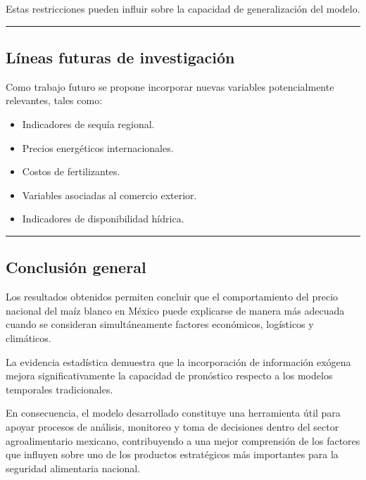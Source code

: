 \documentclass[11pt]{article}
\providecommand{\tightlist}{%
      \setlength{\itemsep}{0pt}\setlength{\parskip}{0pt}}
\begin{document}
Estas restricciones pueden influir sobre la capacidad de generalización
del modelo.

\begin{center}\rule{0.5\linewidth}{0.5pt}\end{center}

\hypertarget{luxedneas-futuras-de-investigaciuxf3n}{%
\subsection{Líneas futuras de
investigación}\label{luxedneas-futuras-de-investigaciuxf3n}}

Como trabajo futuro se propone incorporar nuevas variables
potencialmente relevantes, tales como:

\begin{itemize}
\tightlist
\item
  Indicadores de sequía regional.
\item
  Precios energéticos internacionales.
\item
  Costos de fertilizantes.
\item
  Variables asociadas al comercio exterior.
\item
  Indicadores de disponibilidad hídrica.
\end{itemize}

\begin{center}\rule{0.5\linewidth}{0.5pt}\end{center}

\hypertarget{conclusiuxf3n-general}{%
\subsection{Conclusión general}\label{conclusiuxf3n-general}}

Los resultados obtenidos permiten concluir que el comportamiento del
precio nacional del maíz blanco en México puede explicarse de manera más
adecuada cuando se consideran simultáneamente factores económicos,
logísticos y climáticos.

La evidencia estadística demuestra que la incorporación de información
exógena mejora significativamente la capacidad de pronóstico respecto a
los modelos temporales tradicionales.

En consecuencia, el modelo desarrollado constituye una herramienta útil
para apoyar procesos de análisis, monitoreo y toma de decisiones dentro
del sector agroalimentario mexicano, contribuyendo a una mejor
comprensión de los factores que influyen sobre uno de los productos
estratégicos más importantes para la seguridad alimentaria nacional.
\end{document}
